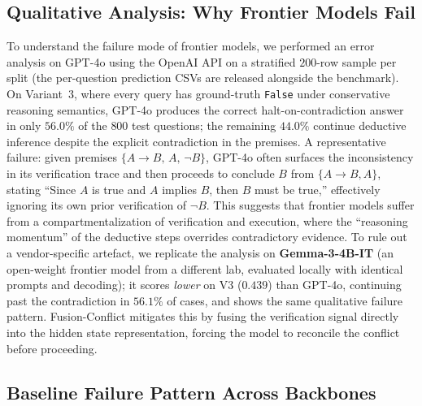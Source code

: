\documentclass{article}
\begin{document}
\subsection{Qualitative Analysis: Why Frontier Models Fail}
\label{app:qualitative}
To understand the failure mode of frontier models, we performed an error analysis on GPT-4o using the OpenAI API on a stratified $200$-row sample per split (the per-question prediction CSVs are released alongside the benchmark). On Variant~3, where every query has ground-truth \texttt{False} under conservative reasoning semantics, GPT-4o produces the correct halt-on-contradiction answer in only $56.0\%$ of the $800$ test questions; the remaining $44.0\%$ continue deductive inference despite the explicit contradiction in the premises. A representative failure: given premises $\{A \to B,\, A,\, \neg B\}$, GPT-4o often surfaces the inconsistency in its verification trace and then proceeds to conclude $B$ from $\{A \to B, A\}$, stating ``Since $A$ is true and $A$ implies $B$, then $B$ must be true,'' effectively ignoring its own prior verification of $\neg B$. This suggests that frontier models suffer from a compartmentalization of verification and execution, where the ``reasoning momentum'' of the deductive steps overrides contradictory evidence. To rule out a vendor-specific artefact, we replicate the analysis on \textbf{Gemma-3-4B-IT} (an open-weight frontier model from a different lab, evaluated locally with identical prompts and decoding); it scores \emph{lower} on V3 ($0.439$) than GPT-4o, continuing past the contradiction in $56.1\%$ of cases, and shows the same qualitative failure pattern. Fusion-Conflict mitigates this by fusing the verification signal directly into the hidden state representation, forcing the model to reconcile the conflict before proceeding.


\subsection{Baseline Failure Pattern Across Backbones}
\label{app:baseline-table}
\end{document}
